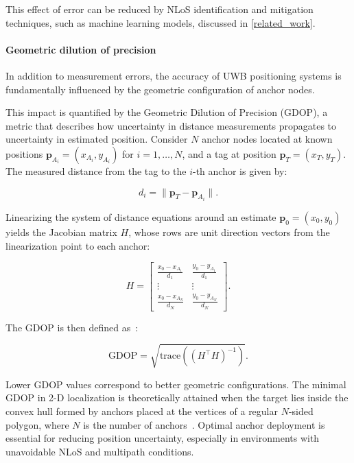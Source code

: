 This effect of error can be reduced by NLoS identification and mitigation techniques, such as machine learning models, discussed in \autoref{related_work}.

\paragraph{Geometric dilution of precision}

In addition to measurement errors, the accuracy of UWB positioning systems is fundamentally influenced by the geometric configuration of anchor nodes.

This impact is quantified by the Geometric Dilution of Precision (GDOP), a metric that describes how uncertainty in distance measurements propagates to uncertainty in estimated position. Consider $N$ anchor nodes located at known positions $\mathbf{p}_{A_i} = (x_{A_i}, y_{A_i})$ for $i = 1, \dots, N$, and a tag at position $\mathbf{p}_T = (x_T, y_T)$. The measured distance from the tag to the $i$-th anchor is given by:

\begin{equation}
d_i = \|\mathbf{p}_T - \mathbf{p}_{A_i}\|.
\end{equation}

Linearizing the system of distance equations around an estimate $\mathbf{p}_0 = (x_0, y_0)$ yields the Jacobian matrix $H$, whose rows are unit direction vectors from the linearization point to each anchor:

\begin{equation}
H = \begin{bmatrix}
\frac{x_0 - x_{A_1}}{d_1} & \frac{y_0 - y_{A_1}}{d_1} \\
\vdots & \vdots \\
\frac{x_0 - x_{A_N}}{d_N} & \frac{y_0 - y_{A_N}}{d_N}
\end{bmatrix}.
\end{equation}

The GDOP is then defined as~\cite{Wang2022GDOP}:

\begin{equation}
\text{GDOP} = \sqrt{\text{trace}\left((H^\top H)^{-1}\right)}.
\end{equation}

Lower GDOP values correspond to better geometric configurations. The minimal GDOP in 2-D localization is theoretically attained when the target lies inside the convex hull formed by anchors placed at the vertices of a regular $N$-sided polygon, where $N$ is the number of anchors~\cite{Wang2022GDOP,Levanon2000GDOP}. Optimal anchor deployment is essential for reducing position uncertainty, especially in environments with unavoidable NLoS and multipath conditions.
